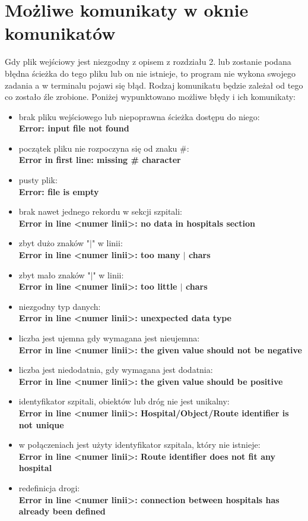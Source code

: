 \documentclass[10pt,a4paper]{article}
\begin{document}
\section{Możliwe komunikaty w oknie komunikatów}
Gdy plik wejściowy jest niezgodny z opisem z rozdziału 2. lub zostanie podana błędna ścieżka do tego pliku lub on nie istnieje, to program nie wykona swojego zadania a w terminalu pojawi się błąd. Rodzaj komunikatu będzie zależał od tego co zostało źle zrobione. Poniżej wypunktowano możliwe błędy i ich komunikaty:
\begin{itemize}
\item brak pliku wejściowego lub niepoprawna ścieżka dostępu do niego: \\ \textbf{Error: input file not found}
\item początek pliku nie rozpoczyna się od znaku \#: \\ \textbf{Error in first line: missing \# character}
\item pusty plik: \\ \textbf{Error: file is empty}
\item brak nawet jednego rekordu w sekcji szpitali: \\ \textbf{Error in line \textless numer linii\textgreater: no data in hospitals section}
\item zbyt dużo znaków "$\mid$" w linii: \\ \textbf{Error in line \textless numer linii\textgreater: too many $\mid$ chars}
\item zbyt mało znaków "$\mid$" w linii: \\ \textbf{Error in line \textless numer linii\textgreater: too little $\mid$ chars}
\item niezgodny typ danych: \\ \textbf{Error in line \textless numer linii\textgreater: unexpected data type}
\item liczba jest ujemna gdy wymagana jest nieujemna: \\ \textbf{Error in line \textless numer linii\textgreater: the given value should not be negative}
\item liczba jest niedodatnia, gdy wymagana jest dodatnia: \\ \textbf{Error in line \textless numer linii\textgreater: the given value should be positive}
\item identyfikator szpitali, obiektów lub dróg nie jest unikalny: \\ \textbf{Error in line \textless numer linii\textgreater : Hospital/Object/Route identifier is not unique }
\item w połączeniach jest użyty identyfikator szpitala, który nie istnieje: \\ \textbf{Error in line \textless numer linii\textgreater: Route identifier does not fit any hospital}
\item redefinicja drogi: \\ \textbf{Error in line \textless numer linii\textgreater : connection between hospitals has already been defined}
\end{itemize}
\end{document}
